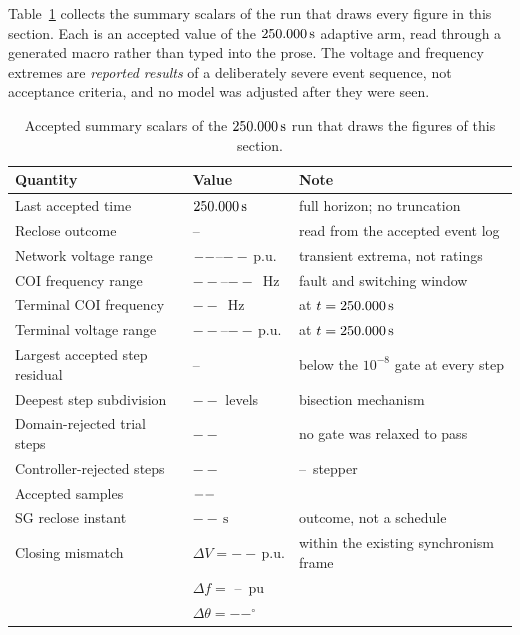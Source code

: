 \documentclass[12pt,a4paper]{article}
\theoremstyle{remark}
\newcommand{\pu}{\,\mathrm{p.u.}}
\newcommand{\second}{\,\mathrm{s}}
\newcommand{\NewRunVMax}{--}\newcommand{\NewRunFMin}{--}%
\newcommand{\NewRunFMax}{--}\newcommand{\NewRunSubdivision}{--}%
\newcommand{\NewRunDomainRejects}{--}\newcommand{\NewRunResidual}{--}%
\newcommand{\NewRunReclose}{--}\newcommand{\NewRunFirstRelease}{--}%
\newcommand{\NewRunSyncDV}{--}\newcommand{\NewRunSyncDF}{--}%
\newcommand{\NewRunSyncDTheta}{--}\newcommand{\NewRunRecloseStatus}{--}%
\newcommand{\NewRunRejectedSteps}{--}\newcommand{\NewRunTerminalF}{--}%
\newcommand{\NewRunTerminalVMin}{--}\newcommand{\NewRunTerminalVMax}{--}%
\newcommand{\NewRunStepper}{--}\newcommand{\NewRunReselection}{--}%
\begin{document}
Table~\ref{tab:runscalars} collects the summary scalars of the run that draws
every figure in this section. Each is an accepted value of the
$\NewRunEnd\second$ adaptive arm, read through a generated macro rather than typed
into the prose. The voltage and frequency extremes are \emph{reported results} of
a deliberately severe event sequence, not acceptance criteria, and no model was
adjusted after they were seen.

\begin{table}[H]
\centering\footnotesize
\caption{Accepted summary scalars of the $\NewRunEnd\second$ run that draws the
figures of this section.}
\label{tab:runscalars}
\begin{tabularx}{\textwidth}{@{}>{\raggedright\arraybackslash}p{}l X@{}}
\toprule
Quantity & Value & Note \\ \midrule
Last accepted time & $\NewRunEnd\second$ & full horizon; no truncation \\
Reclose outcome & \NewRunRecloseStatus & read from the accepted event log \\
Network voltage range & $--$--$\NewRunVMax\pu$ & transient extrema, not ratings \\
COI frequency range & $\NewRunFMin$--$\NewRunFMax$~Hz & fault and switching window \\
Terminal COI frequency & $\NewRunTerminalF$~Hz & at $t=\NewRunEnd\second$ \\
Terminal voltage range & $\NewRunTerminalVMin$--$\NewRunTerminalVMax\pu$ & at $t=\NewRunEnd\second$ \\
Largest accepted step residual & \NewRunResidual & below the $10^{-8}$ gate at every step \\
Deepest step subdivision & $\NewRunSubdivision$ levels & bisection mechanism \\
Domain-rejected trial steps & $\NewRunDomainRejects$ & no gate was relaxed to pass \\
Controller-rejected steps & $\NewRunRejectedSteps$ & \NewRunStepper\ stepper \\
Accepted samples & $--$ & \\
SG reclose instant & $\NewRunReclose\second$ & outcome, not a schedule \\
Closing mismatch & $\Delta V=\NewRunSyncDV\pu$ & within the existing synchronism frame \\
 & $\Delta f=$ \NewRunSyncDF\ pu & \\
 & $\Delta\theta=\NewRunSyncDTheta^{\circ}$ & \\

\end{tabularx}
\end{table}
\end{document}
